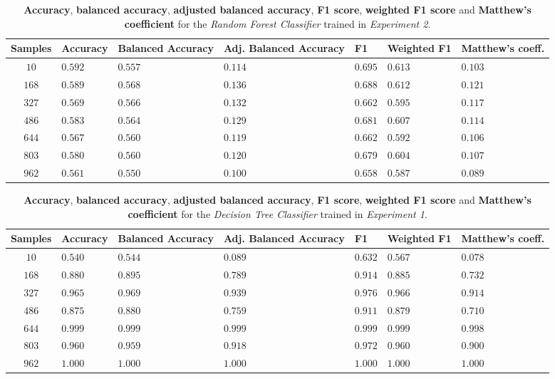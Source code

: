 \documentclass[sigplan,screen]{acmart}
\begin{document}
\begin{table}[h]
  \caption{\textbf{Accuracy}, \textbf{balanced accuracy}, \textbf{adjusted balanced accuracy}, \textbf{F1 score}, \textbf{weighted F1 score} and \textbf{Matthew's coefficient} for the \emph{Random Forest Classifier} trained in \emph{Experiment 2}.}
  \label{tab:rf_2_table_results}
  \begin{tabular}{cllllll}
    \toprule
    \textbf{Samples}&\textbf{Accuracy}&\textbf{Balanced Accuracy}&\textbf{Adj. Balanced Accuracy}&\textbf{F1}&\textbf{Weighted F1}&\textbf{Matthew's coeff.}\\
    \midrule
    $10$ & $0.592$ & $0.557$ & $0.114$ & $0.695$ & $0.613$ & $0.103$\\
    $168$ & $0.589$ & $0.568$ & $0.136$ & $0.688$ & $0.612$ & $0.121$\\
    $327$ & $0.569$ & $0.566$ & $0.132$ & $0.662$ & $0.595$ & $0.117$\\
    $486$ & $0.583$ & $0.564$ & $0.129$ & $0.681$ & $0.607$ & $0.114$\\
    $644$ & $0.567$ & $0.560$ & $0.119$ & $0.662$ & $0.592$ & $0.106$\\
    $803$ & $0.580$ & $0.560$ & $0.120$ & $0.679$ & $0.604$ & $0.107$\\
    $962$ & $0.561$ & $0.550$ & $0.100$ & $0.658$ & $0.587$ & $0.089$\\
    \bottomrule
    \end{tabular}
\end{table}

\begin{table}[h]
  \caption{\textbf{Accuracy}, \textbf{balanced accuracy}, \textbf{adjusted balanced accuracy}, \textbf{F1 score}, \textbf{weighted F1 score} and \textbf{Matthew's coefficient} for the \emph{Decision Tree Classifier} trained in \emph{Experiment 1}.}
  \label{tab:dc_1_table_results}
  \begin{tabular}{cllllll}
    \toprule
    \textbf{Samples}&\textbf{Accuracy}&\textbf{Balanced Accuracy}&\textbf{Adj. Balanced Accuracy}&\textbf{F1}&\textbf{Weighted F1}&\textbf{Matthew's coeff.}\\
    \midrule
    $10$ & $0.540$ & $0.544$ & $0.089$ & $0.632$ & $0.567$ & $0.078$\\
    $168$ & $0.880$ & $0.895$ & $0.789$ & $0.914$ & $0.885$ & $0.732$\\
    $327$ & $0.965$ & $0.969$ & $0.939$ & $0.976$ & $0.966$ & $0.914$\\
    $486$ & $0.875$ & $0.880$ & $0.759$ & $0.911$ & $0.879$ & $0.710$\\
    $644$ & $0.999$ & $0.999$ & $0.999$ & $0.999$ & $0.999$ & $0.998$\\
    $803$ & $0.960$ & $0.959$ & $0.918$ & $0.972$ & $0.960$ & $0.900$\\
    $962$ & $1.000$ & $1.000$ & $1.000$ & $1.000$ & $1.000$ & $1.000$\\
    \bottomrule
    \end{tabular}
\end{table}
\end{document}
